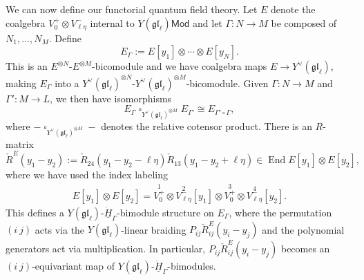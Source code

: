 \documentclass[11pt]{report}
\theoremstyle{definition}
\theoremstyle{remark}
\theoremstyle{remark}
\begin{document}
We can now define our functorial quantum field theory. Let $E$ denote the coalgebra $V_0^+ \otimes V_{\ell\eta}^-$ internal to $Y(\mathfrak{gl}_\ell)\mathsf{Mod}$ and let $\Gamma: N \to M$ be composed of $N_1,...,N_M$. Define
\begin{equation*}
E_\Gamma := E[y_1] \otimes \cdots \otimes E[y_N].
\end{equation*}
This is an $E^{\otimes N}$-$E^{\otimes M}$-bicomodule and we have coalgebra maps $E \to Y^\vee(\mathfrak{gl}_\ell)$, making $E_\Gamma$ into a $Y^\vee(\mathfrak{gl}_\ell)^{\otimes N}$-$Y^\vee(\mathfrak{gl}_\ell)^{\otimes M}$-bicomodule. Given $\Gamma: N \to M$ and $\Gamma': M \to L$, we then have isomorphisms
\begin{equation*}
E_\Gamma \operatorname{\square}_{Y^\vee(\mathfrak{gl}_\ell)^{\otimes M}} E_{\Gamma'} \cong E_{\Gamma' \circ \Gamma},
\end{equation*}
where $- \operatorname{\square}_{Y^\vee(\mathfrak{gl}_\ell)^{\otimes M}} -$ denotes the relative cotensor product. There is an $R$-matrix
\begin{equation*}
\check R^E(y_1-y_2) := \check R_{24}(y_1-y_2-\ell\eta) \check R_{13}(y_1-y_2+\ell\eta) \in \operatorname{End} E[y_1] \otimes E[y_2],
\end{equation*}
where we have used the index labeling
\begin{align*}
E[y_1] \otimes E[y_2]
= \overset{1}{V_0^+} \otimes \overset{2}{V_{\ell\eta}^-}[y_1] \otimes \overset{3}{V_0^+} \otimes \overset{4}{V_{\ell\eta}^-}[y_2].
\end{align*}
This defines a $Y(\mathfrak{gl}_\ell)$-$\underline{\dot H}_\Gamma$-bimodule structure on $E_\Gamma$, where the permutation $(i \ j)$ acts via the $Y(\mathfrak{gl}_\ell)$-linear braiding $P_{ij} \check R_{ij}^E(y_i-y_j)$ and the polynomial generators act via multiplication. In particular, $P_{ij} \check R_{ij}^E(y_i-y_j)$ becomes an $(i \ j)$-equivariant map of $Y(\mathfrak{gl}_\ell)$-$\underline{\dot H}_\Gamma$-bimodules.
\end{document}
